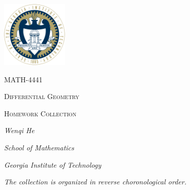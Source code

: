 \documentclass[10pt]{article}
\begin{document}
\begin{titlepage}
	\centering
	\par
	\vspace{5cm}
	\includegraphics[width=120px]{logo.png}\par
	\vspace{3cm}
	{\scshape\Large MATH-4441\par}
	{\Huge\scshape Differential Geometry \par}
	\vspace{0.3cm}
	{\scshape\LARGE Homework Collection \par}
	\vspace{2cm}
	\vfill
	{\itshape\Large Wenqi He\par}
	\vspace{0.3cm}
	{\itshape\Large School of Mathematics\par}	
	\vspace{0.3cm}
	{\itshape\Large Georgia Institute of Technology \par}
	\vfill
	{\large\itshape The collection is organized in reverse choronological order.}
\end{titlepage}
\end{document}
